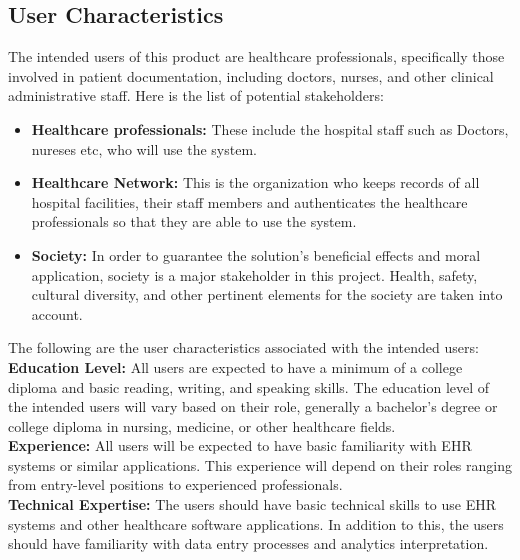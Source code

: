 \documentclass[12pt]{article}
\begin{document}
\subsection{User Characteristics} \label{sec_UserCharacteristics}

The intended users of this product are healthcare professionals, specifically those involved in patient documentation, including doctors, nurses, and other clinical administrative staff. Here is the list of potential stakeholders:\\

\begin{itemize}
  \item\textbf{Healthcare professionals:} These include the hospital staff such as Doctors, nureses etc, who will use the system.
  \item\textbf{Healthcare Network:} This is the organization who keeps records of all hospital facilities, their staff members and authenticates the healthcare professionals so that they are able to use the system.
  \item\textbf{Society:} In order to guarantee the solution's beneficial effects and moral application, society is a major stakeholder in this project. Health, safety, cultural diversity, and other pertinent elements for the society are taken into account.
\end{itemize}

The following are the user characteristics associated with the intended users:\\

\textbf{Education Level:} All users are expected to have a minimum of a college diploma and basic reading, writing, and speaking skills. The education level of the intended users will vary based on their role, generally a bachelor’s degree or college diploma in nursing, medicine, or other healthcare fields. \\

\textbf{Experience:} All users will be expected to have basic familiarity with EHR systems or similar applications. This experience will depend on their roles ranging from entry-level positions to experienced professionals. \\

\textbf{Technical Expertise:} The users should have basic technical skills to use EHR systems and other healthcare software applications. In addition to this, the users should have familiarity with data entry processes and analytics interpretation. \\
\end{document}
